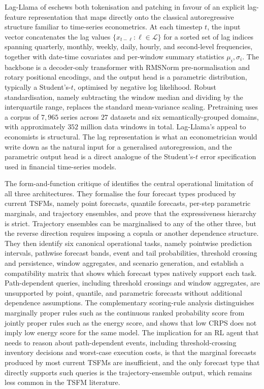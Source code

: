 Lag-Llama of \citet{Rasul2023} eschews both tokenisation and patching in favour
of an explicit lag-feature representation that maps directly onto the classical
autoregressive structure familiar to time-series econometrics. At each timestep
$t$, the input vector concatenates the lag values
$\{x_{t-\ell} : \ell \in \mathcal L\}$ for a sorted set of lag indices spanning
quarterly, monthly, weekly, daily, hourly, and second-level frequencies,
together with date-time covariates and per-window summary statistics
$\mu_i, \sigma_i$. The backbone is a decoder-only transformer with RMSNorm
pre-normalisation and rotary positional encodings, and the output head is a
parametric distribution, typically a Student's-$t$, optimised by negative log
likelihood. Robust standardisation, namely subtracting the window median and
dividing by the interquartile range, replaces the standard mean-variance
scaling. Pretraining uses a corpus of $7{,}965$ series across $27$ datasets and
six semantically-grouped domains, with approximately $352$ million data windows
in total. Lag-Llama's appeal to economists is structural. The lag representation
is what an econometrician would write down as the natural input for a
generalised autoregression, and the parametric output head is a direct analogue
of the Student's-$t$ error specification used in financial time-series models.

The form-and-function critique of \citet{PerezDiaz2025} identifies the central
operational limitation of all three architectures. They formalise the four
forecast types produced by current TSFMs, namely point forecasts, quantile
forecasts, per-step parametric marginals, and trajectory ensembles, and prove
that the expressiveness hierarchy is strict. Trajectory ensembles can be
marginalised to any of the other three, but the reverse direction requires
imposing a copula or another dependence structure. They then identify six
canonical operational tasks, namely pointwise prediction intervals, pathwise
forecast bands, event and tail probabilities, threshold crossing and persistence,
window aggregates, and scenario generation, and establish a compatibility matrix
that shows which forecast types natively support each task. Path-dependent
queries, including threshold crossings and window aggregates, are unsupported by
point, quantile, and parametric forecasts without additional dependence
assumptions. The complementary scoring-rule analysis distinguishes marginally
proper rules such as the continuous ranked probability score from jointly proper
rules such as the energy score, and shows that low CRPS does not imply low
energy score for the same model. The implication for an RL agent that needs to
reason about path-dependent events, including threshold-crossing inventory
decisions and worst-case execution costs, is that the marginal forecasts
produced by most current TSFMs are insufficient, and the only forecast type
that directly supports such queries is the trajectory-ensemble output, which
remains less common in the TSFM literature.

